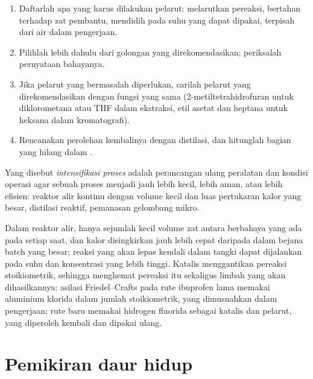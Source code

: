 \begin{method}\label{met:b3:green-industrial:solvent-choice}
\begin{enumerate}
  \item Daftarlah apa yang harus dilakukan pelarut: melarutkan pereaksi, bertahan terhadap zat pembantu,
        mendidih pada suhu yang dapat dipakai, terpisah dari air dalam pengerjaan.
  \item Pilihlah lebih dahulu dari golongan yang direkomendasikan; periksalah pernyataan bahayanya.
  \item Jika pelarut yang bermasalah diperlukan, carilah pelarut yang direkomendasikan dengan
        fungsi yang sama (2-metiltetrahidrofuran untuk diklorometana atau THF dalam
        ekstraksi, etil asetat dan heptana untuk heksana dalam kromatografi).
  \item Rencanakan perolehan kembalinya dengan distilasi, dan hitunglah bagian yang hilang dalam .
\end{enumerate}
\end{method}

\begin{definition}\label{def:b3:green-industrial:intensification}
Yang disebut \emph{intensifikasi proses} adalah
perancangan ulang peralatan dan kondisi operasi agar sebuah proses menjadi jauh lebih kecil,
lebih aman, atau lebih efisien: reaktor alir kontinu dengan volume kecil dan
luas pertukaran kalor yang besar, distilasi reaktif, pemanasan gelombang mikro.
\end{definition}

Dalam reaktor alir, hanya sejumlah kecil volume zat antara berbahaya yang ada pada setiap
saat, dan kalor disingkirkan jauh lebih cepat daripada dalam bejana batch yang besar; reaksi
yang akan lepas kendali dalam tangki dapat dijalankan pada suhu dan
konsentrasi yang lebih tinggi. Katalis menggantikan pereaksi stoikiometrik, sehingga menghemat
pereaksi itu sekaligus limbah yang akan dihasilkannya: asilasi Friedel--Crafts pada rute
ibuprofen lama memakai aluminium klorida dalam jumlah stoikiometrik, yang dimusnahkan dalam
pengerjaan; rute baru memakai hidrogen fluorida sebagai katalis dan pelarut, yang
diperoleh kembali dan dipakai ulang.

\section{Pemikiran daur hidup}

